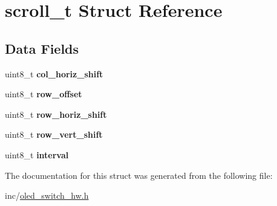 \hypertarget{structscroll__t}{}\section{scroll\+\_\+t Struct Reference}
\label{structscroll__t}
\subsection*{Data Fields}
\begin{DoxyCompactItemize}
\item 
\hypertarget{structscroll__t_abe69addf5da8f79255caf4b88c35c47b}{}uint8\+\_\+t {\bfseries col\+\_\+horiz\+\_\+shift}\label{structscroll__t_abe69addf5da8f79255caf4b88c35c47b}

\item 
\hypertarget{structscroll__t_a93b4aaff35c9580ff68ae7adabe0616f}{}uint8\+\_\+t {\bfseries row\+\_\+offset}\label{structscroll__t_a93b4aaff35c9580ff68ae7adabe0616f}

\item 
\hypertarget{structscroll__t_aad8a5aeb101d3ecc238969b092bdf82f}{}uint8\+\_\+t {\bfseries row\+\_\+horiz\+\_\+shift}\label{structscroll__t_aad8a5aeb101d3ecc238969b092bdf82f}

\item 
\hypertarget{structscroll__t_a3d606f9d3afd48f874e204b86d59a6eb}{}uint8\+\_\+t {\bfseries row\+\_\+vert\+\_\+shift}\label{structscroll__t_a3d606f9d3afd48f874e204b86d59a6eb}

\item 
\hypertarget{structscroll__t_a7a6db7c78ae2acf13f1387ea876ba9a8}{}uint8\+\_\+t {\bfseries interval}\label{structscroll__t_a7a6db7c78ae2acf13f1387ea876ba9a8}

\end{DoxyCompactItemize}


The documentation for this struct was generated from the following file\+:\begin{DoxyCompactItemize}
\item 
inc/\hyperlink{oled__switch__hw_8h}{oled\+\_\+switch\+\_\+hw.\+h}\end{DoxyCompactItemize}
